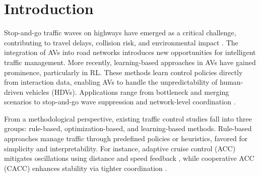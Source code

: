 \documentclass{ifacconf}
\begin{document}
\section{Introduction}
Stop-and-go traffic waves on highways have emerged as a critical challenge, contributing to travel delays, collision risk, and environmental impact \citep{laval2010mechanism}. The integration of AVs into road networks introduces new opportunities for intelligent traffic management.  
More recently, learning-based approaches in AVs have gained prominence, particularly in RL. These methods learn control policies directly from interaction data, enabling AVs to handle the unpredictability of human-driven vehicles (HDVs). Applications range from bottleneck \citep{vinitsky2020optimizing} and merging scenarios \citep{liu2021efficient} to stop-and-go wave suppression \citep{wu2018stabilizing,9765650} and network-level coordination \citep{suriyarachchi2022multi}. 
  
From a methodological perspective, existing traffic control studies fall into three groups: rule-based, optimization-based, and learning-based methods. Rule-based approaches manage traffic through predefined policies or heuristics, favored for simplicity and interpretability. For instance, adaptive cruise control (ACC) mitigates oscillations using distance and speed feedback \citep{vahidi2004research}, while cooperative ACC (CACC) enhances stability via tighter coordination \citep{van2006impact}. 
\end{document}
